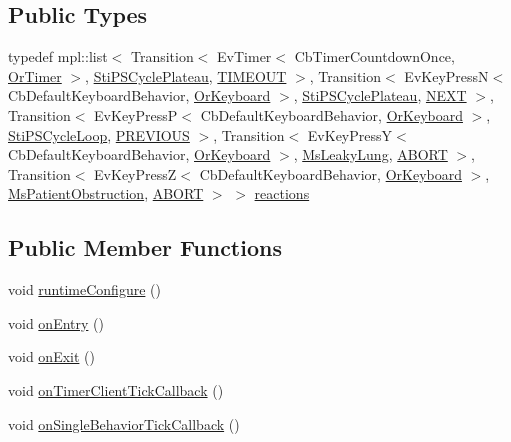 \subsection*{Public Types}
\begin{DoxyCompactItemize}
\item 
typedef mpl\+::list$<$ Transition$<$ Ev\+Timer$<$ Cb\+Timer\+Countdown\+Once, \hyperlink{classsm__respira__1_1_1OrTimer}{Or\+Timer} $>$, \hyperlink{structsm__respira__1_1_1ps__cycle__inner__states_1_1StiPSCyclePlateau}{Sti\+P\+S\+Cycle\+Plateau}, \hyperlink{structsm__respira__1_1_1ps__cycle__inner__states_1_1StiPSCycleInspire_1_1TIMEOUT}{T\+I\+M\+E\+O\+UT} $>$, Transition$<$ Ev\+Key\+PressN$<$ Cb\+Default\+Keyboard\+Behavior, \hyperlink{classsm__respira__1_1_1OrKeyboard}{Or\+Keyboard} $>$, \hyperlink{structsm__respira__1_1_1ps__cycle__inner__states_1_1StiPSCyclePlateau}{Sti\+P\+S\+Cycle\+Plateau}, \hyperlink{structsm__respira__1_1_1ps__cycle__inner__states_1_1StiPSCycleInspire_1_1NEXT}{N\+E\+XT} $>$, Transition$<$ Ev\+Key\+PressP$<$ Cb\+Default\+Keyboard\+Behavior, \hyperlink{classsm__respira__1_1_1OrKeyboard}{Or\+Keyboard} $>$, \hyperlink{structsm__respira__1_1_1ps__cycle__inner__states_1_1StiPSCycleLoop}{Sti\+P\+S\+Cycle\+Loop}, \hyperlink{structsm__respira__1_1_1ps__cycle__inner__states_1_1StiPSCycleInspire_1_1PREVIOUS}{P\+R\+E\+V\+I\+O\+US} $>$, Transition$<$ Ev\+Key\+PressY$<$ Cb\+Default\+Keyboard\+Behavior, \hyperlink{classsm__respira__1_1_1OrKeyboard}{Or\+Keyboard} $>$, \hyperlink{classsm__respira__1_1_1MsLeakyLung}{Ms\+Leaky\+Lung}, \hyperlink{classABORT}{A\+B\+O\+RT} $>$, Transition$<$ Ev\+Key\+PressZ$<$ Cb\+Default\+Keyboard\+Behavior, \hyperlink{classsm__respira__1_1_1OrKeyboard}{Or\+Keyboard} $>$, \hyperlink{classsm__respira__1_1_1MsPatientObstruction}{Ms\+Patient\+Obstruction}, \hyperlink{classABORT}{A\+B\+O\+RT} $>$ $>$ \hyperlink{structsm__respira__1_1_1ps__cycle__inner__states_1_1StiPSCycleInspire_af0b2d05939d43e27ee47eadfc5327e93}{reactions}
\end{DoxyCompactItemize}
\subsection*{Public Member Functions}
\begin{DoxyCompactItemize}
\item 
void \hyperlink{structsm__respira__1_1_1ps__cycle__inner__states_1_1StiPSCycleInspire_a9af0139728042cf48d7a9e5c70cd8f41}{runtime\+Configure} ()
\item 
void \hyperlink{structsm__respira__1_1_1ps__cycle__inner__states_1_1StiPSCycleInspire_ab06e9c79432e92e95787697c230d80c9}{on\+Entry} ()
\item 
void \hyperlink{structsm__respira__1_1_1ps__cycle__inner__states_1_1StiPSCycleInspire_aacf7c3d984c6384b548e9caa04baf739}{on\+Exit} ()
\item 
void \hyperlink{structsm__respira__1_1_1ps__cycle__inner__states_1_1StiPSCycleInspire_a2bc93095187e5dac5c21cb899555678c}{on\+Timer\+Client\+Tick\+Callback} ()
\item 
void \hyperlink{structsm__respira__1_1_1ps__cycle__inner__states_1_1StiPSCycleInspire_ad95cb458b90dcbb2402b8e890f4b027d}{on\+Single\+Behavior\+Tick\+Callback} ()
\end{DoxyCompactItemize}
